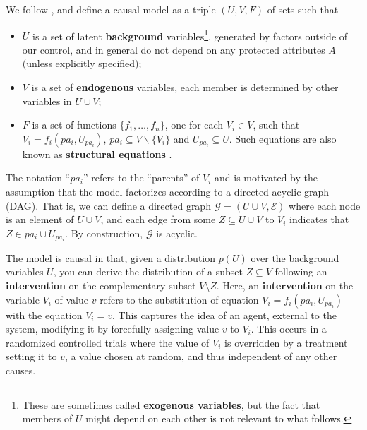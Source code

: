 


\label{subsec:cmc}
We follow %
\citet{pearl:00}, and define a causal
model as a triple $(U, V, F)$ of sets such that
%
\begin{itemize}
\item $U$ is a set of latent {\bf background} variables\footnote{These are
  sometimes called {\bf exogenous variables}, but the fact that members of $U$
  might depend on each other is not relevant to what follows.}, generated by factors
outside of our control, and in general do not depend on any protected attributes $A$ (unless  explicitly specified);
\item $V$ is a set of {\bf endogenous} variables, each member is determined by
  other variables in $U \cup V$;
\item $F$ is a set of functions $\{f_1, \dots, f_n\}$, one for each $V_i \in V$, such
that $V_i = f_i(pa_i, U_{pa_i})$, $pa_i \subseteq V \backslash
\{V_i\}$ and $U_{pa_i} \subseteq U$. Such equations are also known as
{\bf structural equations} \citep{bol:89}.
\end{itemize}
%
The notation ``$pa_i$'' refers to the ``parents'' of $V_i$ and is motivated by the assumption that the
model factorizes according to a directed acyclic graph (DAG). That is, we can
define a directed graph ${\mathcal G}=(U \cup V, \mathcal E )$ where each node is an
element of $U \cup V$, and each edge from some $Z \subseteq U \cup V$ to $V_i$ indicates that $Z \in pa_i \cup U_{pa_i}$. By construction, $\mathcal G$ is
acyclic.

The model is causal in that, given a distribution $p(U)$
over the background variables $U$, you can derive the distribution of
a subset $Z \subseteq V$ following an {\bf intervention} on the
complementary subset $V\setminus Z$.  Here,
an {\bf intervention} on the variable $V_i$ of value $v$ refers to the substitution of
equation $V_i = f_i(pa_i, U_{pa_i})$ with the equation $V_i =
v$. This captures the idea of an agent, external to the
system, modifying it by forcefully assigning value $v$ to $V_i$. This occurs in a randomized controlled trials where the value
of $V_i$ is overridden by a treatment setting it to $v$, a value
chosen at random, and thus independent of any other causes.%

